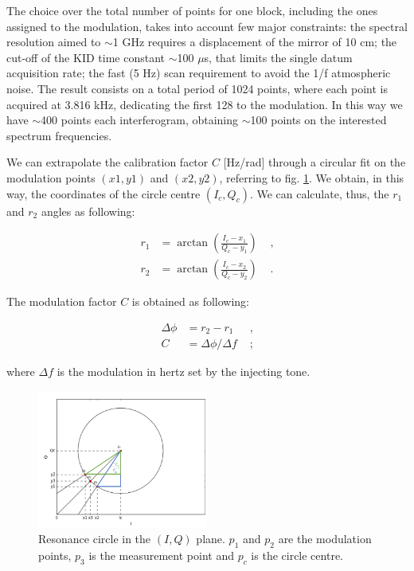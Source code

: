 \noindent The choice over the total number of points for one block, including the ones assigned to the modulation, takes into account few major constraints: the spectral resolution aimed to $\sim$1 GHz requires a displacement of the mirror of 10 cm; the cut-off of the KID time constant $\sim$100 $\mu$s, that limits the single datum acquisition rate; the fast (5 Hz) scan requirement to avoid the 1/f atmospheric noise. The result consists on a total period of 1024 points, where each point is acquired at 3.816 kHz, dedicating the first 128 to the modulation. In this way we have $\sim$400 points each interferogram, obtaining $\sim$100 points on the interested spectrum frequencies.

\noindent We can extrapolate the calibration factor $C$ [Hz/rad] through a circular fit on the modulation points $(x1,y1)$ and $(x2,y2)$, referring to fig. \ref{fig:IQ_modulation}. We obtain, in this way, the coordinates of the circle centre $(I_c,Q_c)$. We can calculate, thus, the $r_1$ and $r_2$ angles as following:

\begin{equation}
\begin{align}
r_1 &= \arctan\left( \frac{I_c-x_1}{Q_c - y_1}  \right) &\text{ ,}\\
r_2 &= \arctan\left( \frac{I_c-x_2}{Q_c - y_2}  \right) &\text{ .}
\end{align}
\end{equation}

\noindent The modulation factor $C$ is obtained as following:

\begin{equation}
\begin{align}
\Delta \phi &= r_2-r_1 &\text{ ,}\\
C&=\Delta\phi/\Delta f &\text{ ;}
\end{align}
\end{equation}

\noindent where $\Delta f$ is the modulation in hertz set by the injecting tone.

\begin{figure}[htf]
	\centering
	\includegraphics[width=0.5\textwidth]{3.acqui/circle.png}
	\caption{Resonance circle in the $(I,Q)$ plane. $p_1$ and $p_2$ are the modulation points, $p_3$ is the measurement point and $p_c$ is the circle centre. }
	\label{fig:IQ_modulation}
\end{figure}

